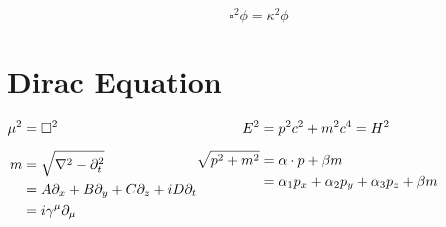 \documentclass[12pt]{article}
\newcommand{\hs}{\hspace{1pt}} %
\begin{document}
\hfill\hs

\vspace{15pt}

\[ \boxed{ \square^2 \phi = \kappa^2 \phi } \]

\newpage
\section{Dirac Equation}

\noindent
\(
    \hfill
    \begin{aligned}[t]
        \mu^2 & = \square^2
            \\[5pt]
        m & = \sqrt{\nabla^2 - \partial_t^2} \\
        & = A \partial_x + B \partial_y + C \partial_z + i D \partial_t \\
        & = i \gamma^\mu \partial_\mu
    \end{aligned}
    \hfill
    \begin{aligned}[t]
        E^2 & = p^2 c^2 + m^2 c^4 = H^2
            \\[5pt]
        \sqrt{p^2 + m^2} & = \alpha \cdot p + \beta m\\
        & = \alpha_1 p_x + \alpha_2 p_y + \alpha_3 p_z + \beta m
    \end{aligned}
    \hfill
\)
\end{document}
